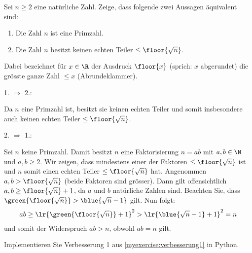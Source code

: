 \begin{myexercise}[Verbesserung 1]\label{myexercise:verbesserung1}
	Sei $n\geq 2$ eine natürliche Zahl. Zeige, dass folgende zwei Aussagen äquivalent sind:
	\begin{enumerate}
		\item Die Zahl $n$ ist eine Primzahl.
		\item Die Zahl $n$ besitzt keinen echten Teiler $\leq \floor{\sqrt{n}}$.
	\end{enumerate}
	Dabei bezeichnet für $x\in\R$ der Ausdruck $\floor{x}$ (sprich: $x$ abgerundet) die grösste ganze Zahl $\leq x$ (Abrundeklammer).
	\begin{myanswer}
		1. $\Rightarrow$ 2.:

		Da $n$ eine Primzahl ist, besitzt sie keinen echten Teiler und somit insbesondere auch keinen echten Teiler $\leq \floor{\sqrt{n}}$.

		2. $\Rightarrow$ 1.:

		Sei $n$ keine Primzahl.
		Damit besitzt $n$ eine Faktorisierung $n = ab$ mit $a,b\in\N$ und $a,b\geq 2$.
		Wir zeigen, dass mindestens einer der Faktoren $\leq \floor{\sqrt{n}}$ ist und $n$ somit einen echten Teiler $\leq \floor{\sqrt{n}}$ hat.
		Angenommen $a, b > \floor{\sqrt{n}}$ (beide Faktoren sind grösser).
		Dann gilt offensichtlich $a, b \geq \floor{\sqrt{n}} + 1$, da $a$ und $b$ natürliche Zahlen sind.
		Beachten Sie, dass $\green{\floor{\sqrt{n}}} > \blue{\sqrt{n} - 1}$ gilt. Nun folgt:
		\begin{align*}
			ab \geq \lr{\green{\floor{\sqrt{n}}} + 1}^2 > \lr{\blue{\sqrt{n} - 1} + 1}^2 = n
		\end{align*}
		und somit der Widerspruch $ab > n$, obwohl $ab = n$ gilt.
	\end{myanswer}
\end{myexercise}

\begin{myexercise}\label{myexercise:implementVerbesserung1}
	Implementieren Sie Verbesserung 1 aus \cref{myexercise:verbesserung1} in Python.
	\begin{myanswer}
		
	\end{myanswer}
\end{myexercise}

